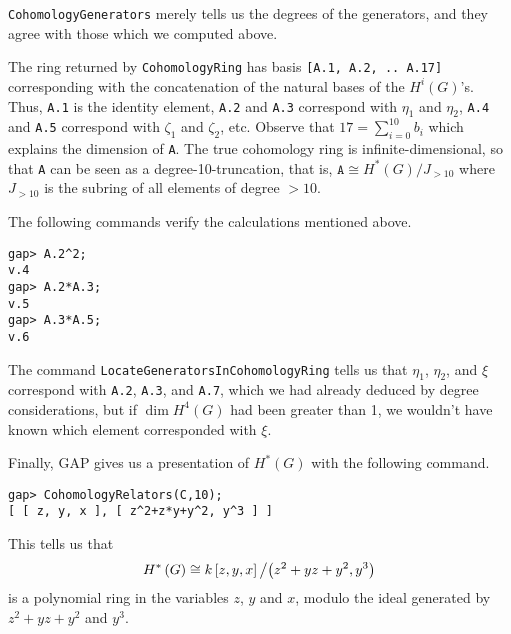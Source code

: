\documentclass[12pt]{article}
\begin{document}
\verb!CohomologyGenerators! merely tells us the
degrees of the generators, and they agree with
those which we computed above.

The ring returned by \verb!CohomologyRing! has basis 
\verb![A.1, A.2, .. A.17]! corresponding with 
the concatenation of the natural bases
of the $H^i\left(G\right)$'s. Thus, \verb!A.1!
is the identity element, \verb!A.2! and \verb!A.3!
correspond with $\eta_1$ and $\eta_2$, 
\verb!A.4! and \verb!A.5! correspond with $\zeta_1$ and $\zeta_2$,
etc. Observe that $17=\sum_{i=0}^{10} b_i$
which explains the dimension of \verb!A!. The true
cohomology ring is infinite-dimensional, so that
\verb!A! can be seen as a degree-10-truncation,
that is, 
$\mathtt{A}\cong H^\ast\left(G\right)/J_{>10}$ where
$J_{>10}$ is the subring of all elements of degree $>10$.

The following commands verify the calculations mentioned above.
\begin{verbatim}
gap> A.2^2;
v.4
gap> A.2*A.3;
v.5
gap> A.3*A.5;
v.6
\end{verbatim}

The command \verb!LocateGeneratorsInCohomologyRing! tells
us that $\eta_1$, $\eta_2$, and $\xi$ correspond with
\verb!A.2!, \verb!A.3!, and \verb!A.7!, which we had
already deduced by degree considerations, but if
$\dim H^4\left(G\right)$ had been greater than 1,
we wouldn't have known which element corresponded
with $\xi$.

Finally, \textsf{GAP} gives us a presentation of
$H^\ast\left(G\right)$ with the following command.
\begin{verbatim}
gap> CohomologyRelators(C,10);
[ [ z, y, x ], [ z^2+z*y+y^2, y^3 ] ]
\end{verbatim}
This tells us that
\[H^\ast\left(G\right)\cong k\left[z,y,x\right]
\left/\left(z^2+yz+y^2,y^3\right)\right.\]
is a polynomial ring in the variables $z$, $y$ and $x$, 
modulo the ideal generated by 
$z^2+yz+y^2$ and $y^3$.
\end{document}
